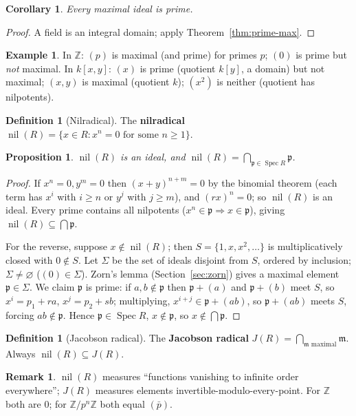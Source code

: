 \documentclass[11pt,a4paper]{article}
\newtheorem{proposition}[theorem]{Proposition}
\newtheorem{corollary}[theorem]{Corollary}
\theoremstyle{definition}
\newtheorem{definition}[theorem]{Definition}
\newtheorem{example}[theorem]{Example}
\newtheorem{remark}[theorem]{Remark}
\newcommand{\Z}{\mathbb{Z}}
\newcommand{\Spec}{\operatorname{Spec}}
\newcommand{\nil}{\operatorname{nil}}
\newcommand{\p}{\mathfrak{p}}
\newcommand{\m}{\mathfrak{m}}
\begin{document}
	\begin{corollary}
		Every maximal ideal is prime.
	\end{corollary}
	\begin{proof}
		A field is an integral domain; apply Theorem~\ref{thm:prime-max}.
	\end{proof}
	
	\begin{example}
		In $\Z$: $(p)$ is maximal (and prime) for primes $p$; $(0)$ is prime but \emph{not} maximal.
		In $k[x,y]$: $(x)$ is prime (quotient $k[y]$, a domain) but not maximal; $(x,y)$ is maximal
		(quotient $k$); $(x^2)$ is neither (quotient has nilpotents).
	\end{example}
	
	\begin{definition}[Nilradical]
		The \textbf{nilradical} $\nil(R)=\{x\in R:x^n=0 \text{ for some } n\ge1\}$.
	\end{definition}
	
	\begin{proposition}\label{prop:nilradical}
		$\nil(R)$ is an ideal, and $\nil(R)=\bigcap_{\p\in\Spec R}\p$.
	\end{proposition}
	\begin{proof}
		If $x^n=0,y^m=0$ then $(x+y)^{n+m}=0$ by the binomial theorem (each term has $x^i$ with $i\ge n$ or
		$y^j$ with $j\ge m$), and $(rx)^n=0$; so $\nil(R)$ is an ideal. Every prime contains all nilpotents
		($x^n\in\p\Rightarrow x\in\p$), giving $\nil(R)\subseteq\bigcap\p$.
		
		For the reverse, suppose $x\notin\nil(R)$; then $S=\{1,x,x^2,\dots\}$ is multiplicatively closed with
		$0\notin S$. Let $\Sigma$ be the set of ideals disjoint from $S$, ordered by inclusion; $\Sigma\neq\varnothing$
		($(0)\in\Sigma$). Zorn's lemma (Section~\ref{sec:zorn}) gives a maximal element $\p\in\Sigma$. We claim
		$\p$ is prime: if $a,b\notin\p$ then $\p+(a)$ and $\p+(b)$ meet $S$, so $x^i=p_1+ra$, $x^j=p_2+sb$;
		multiplying, $x^{i+j}\in\p+(ab)$, so $\p+(ab)$ meets $S$, forcing $ab\notin\p$. Hence $\p\in\Spec R$,
		$x\notin\p$, so $x\notin\bigcap\p$.
	\end{proof}
	
	\begin{definition}[Jacobson radical]
		The \textbf{Jacobson radical} $J(R)=\bigcap_{\m\text{ maximal}}\m$. Always $\nil(R)\subseteq J(R)$.
	\end{definition}
	\begin{remark}
		$\nil(R)$ measures ``functions vanishing to infinite order everywhere''; $J(R)$ measures elements
		invertible-modulo-every-point. For $\Z$ both are $0$; for $\Z/p^n\Z$ both equal $(\bar p)$.
	\end{remark}
	
\end{document}
